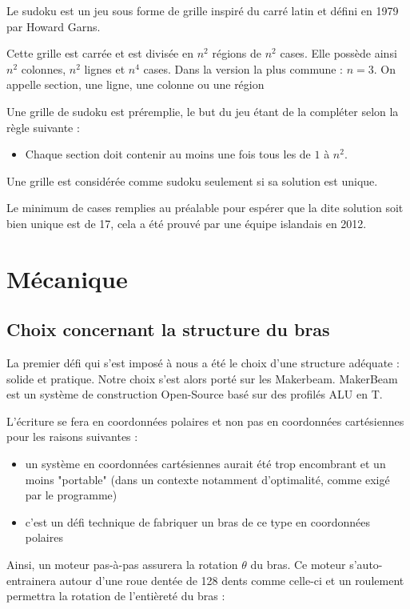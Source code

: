 \documentclass[12pt,a4paper]{report}
\begin{document}
	Le sudoku est un jeu sous forme de grille inspiré du carré latin et défini en 1979 par Howard Garns.
	
	Cette grille est carrée et est divisée en $n^2$ régions de $n^2$ cases. Elle possède ainsi $n^2$ colonnes, $n^2$ lignes et $n^4$ cases. Dans la version la plus commune : $n=3$. On appelle section, une ligne, une colonne ou une région

Une grille de sudoku est préremplie, le but du jeu étant de la compléter selon la règle suivante :
\begin{itemize}[label=--]
\item Chaque section doit contenir au moins une fois tous les de $1$ à $n^2$.
\end{itemize} 

Une grille est considérée comme sudoku seulement si sa solution est unique.

Le minimum de cases remplies au préalable pour espérer que la dite solution soit bien unique est de 17, cela a été prouvé par une équipe islandais en 2012.

	\chapter{Mécanique}	
	\section{Choix concernant la structure du bras}
	La premier défi qui s'est imposé à nous a été le choix d'une structure adéquate : solide et pratique. Notre choix s'est alors porté sur les Makerbeam. MakerBeam est un système de construction Open-Source basé sur des profilés ALU en T.
	
	L'écriture se fera en coordonnées polaires et non pas en coordonnées cartésiennes pour les raisons suivantes :
	\begin{itemize}[label=--]
	\item un système en coordonnées cartésiennes aurait été trop encombrant et un moins "portable" (dans un contexte notamment d'optimalité, comme exigé par le programme)
	\item c'est un défi technique de fabriquer un bras de ce type en coordonnées polaires
	\end{itemize}
	
Ainsi, un moteur pas-à-pas assurera la rotation $\theta$ du bras. Ce moteur s'auto-entrainera autour d'une roue dentée de 128 dents comme celle-ci et un roulement permettra la rotation de l'entièreté du bras :
\end{document}
